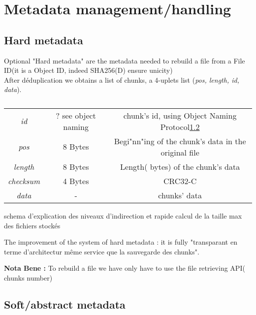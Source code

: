 \section{Metadata management/handling}
\subsection{Hard metadata}
Optional
"Hard metadata" are the metadata needed to rebuild a file from a File ID(it is a Object ID, indeed SHA256(D) ensure unicity)\\

After déduplication we obtains a list of chunks, a 4-uplets list (\textit{pos, length, id, data}).\\

\begin{table}[h]
  \centering
  \begin{tabular}{|c|c|c|}
    \hline
    \textit{id} & ? see object naming & chunk's id, using Object Naming Protocol\ref{}\\
    \textit{pos} & 8 Bytes & Begi"nn"ing of the chunk's data in the original file\\
    \textit{length} & 8 Bytes & Length( bytes) of the chunk's data\\
    \textit{checksum} & 4 Bytes & CRC32-C\\
    \textit{data} & - & chunks' data\\
    \hline
  \end{tabular}
  \caption{}
\end{table}

schema d'explication des niveaux d'indirection
et rapide calcul de la taille max des fichiers stockés

The improvement of the system of hard metadata : it is fully "transparant en terme d'architectur même service que la sauvegarde des chunks".

\textbf{Nota Bene :} To rebuild a file we have only have to use the file retrieving API( chunks number)


\subsection{Soft/abstract metadata}
